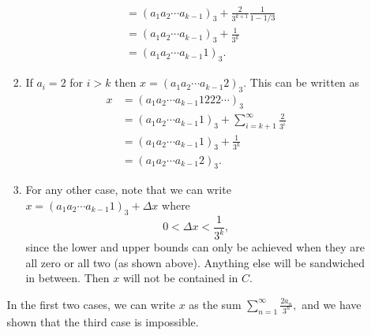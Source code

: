 \documentclass{article}
\numberwithin{equation}{section}
\begin{document}
\begin{enumerate}
\begin{enumerate}[label=Proof of (\arabic*)]
\begin{enumerate}[label=Case (\arabic*)]
\begin{align}
                &= (a_1a_2\cdots a_{k-1})_3 + \frac{2}{3^{k+1}}\frac{1}{1-1/3} \\ 
                &= (a_1a_2\cdots a_{k-1})_3 + \frac{1}{3^k} \\ 
                &= (a_1a_2\cdots a_{k-1}1)_3.
            \end{align}
            \item If $a_i=2$ for $i>k$ then $x=(a_1a_2\cdots a_{k-1}2)_3.$ This can be written as 
            \begin{align}
                x &= (a_1a_2\cdots a_{k-1}1222\cdots)_3 \\ 
                &= (a_1a_2\cdots a_{k-1}1)_3 + \sum_{i=k+1}^{\infty}\frac{2}{3^i} \\ 
                &= (a_1a_2\cdots a_{k-1}1)_3 + \frac{1}{3^k} \\ 
                &= (a_1a_2\cdots a_{k-1}2)_3.
            \end{align}
            \item For any other case, note that we can write $x = (a_1a_2\cdots a_{k-1}1)_3 + \Delta x$ where 
            \begin{equation}
                0 < \Delta x < \frac{1}{3^k},
            \end{equation}
            since the lower and upper bounds can only be achieved when they are all zero or all two (as shown above). Anything else will be sandwiched in between. Then $x$ will not be contained in $C.$
        \end{enumerate}
        In the first two cases, we can write $x$ as the sum $\sum_{n=1}^{\infty} \frac{2a_n}{3^n},$ and we have shown that the third case is impossible.


\end{enumerate}
\end{enumerate}
\end{document}
